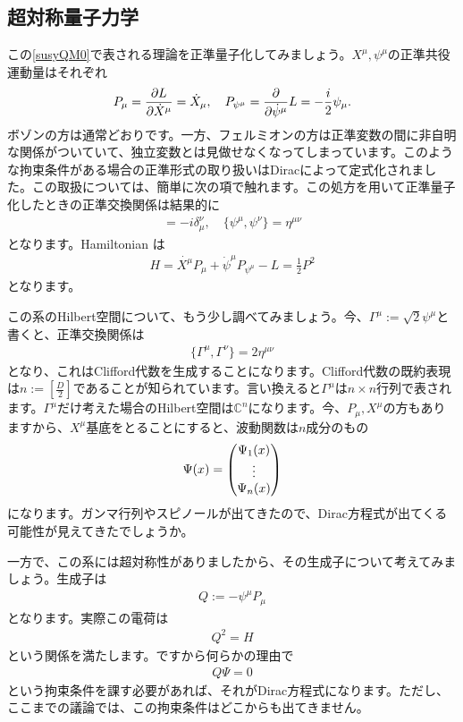 \documentclass[report,paper=a4, fontsize=12pt, line_length=16cm, number_of_lines=33,dvipdfmx]{jlreq}
\numberwithin{equation}{chapter}
\numberwithin{equation}{section}
\newcommand{\Cb}{\mathbb{C}}
\begin{document}
\subsection{超対称量子力学}\label{subsec:susyQM}
この\eqref{susyQM0}で表される理論を正準量子化してみましょう。$X^{\mu},\psi^{\mu}$の正準共役運動量はそれぞれ
\begin{align}
  P_{\mu}=\pdv{L}{\dot{X}^{\mu}}=\dot{X}_{\mu},\quad
  P_{\psi^{\mu}}=\pdv{\dot{\psi}^{\mu}}L=-\frac{i}{2}\psi_{\mu}.
\end{align}
ボゾンの方は通常どおりです。一方、フェルミオンの方は正準変数の間に非自明な関係がついていて、独立変数とは見做せなくなってしまっています。このような拘束条件がある場合の正準形式の取り扱いはDiracによって定式化されました。この取扱については、簡単に次の項で触れます。この処方を用いて正準量子化したときの正準交換関係は結果的に
\begin{align}
  [P_{\mu},X^{\nu}]=-i\delta_{\mu}^{\nu},\quad
  \{\psi^{\mu},\psi^{\nu}\}=\eta^{\mu\nu}
\end{align}
となります。Hamiltonian は
\begin{align}
  H=\dot{X^{\mu}}P_{\mu}+\dot{\psi}^{\mu}P_{\psi^{\mu}}-L=\frac12 P^2
\end{align}
となります。

この系のHilbert空間について、もう少し調べてみましょう。今、$\Gamma^{\mu}:=\sqrt{2}\psi^{\mu}$と書くと、正準交換関係は
\begin{align}
  \{\Gamma^{\mu},\Gamma^{\nu}\}=2\eta^{\mu\nu}
\end{align}
となり、これはClifford代数を生成することになります。Clifford代数の既約表現は$n:=\left[\frac{D}{2}\right]$であることが知られています。言い換えると$\Gamma^{\mu}$は$n\times n$行列で表されます。$\Gamma^{\mu}$だけ考えた場合のHilbert空間は$\Cb^n$になります。今、$P_{\mu},X^{\mu}$の方もありますから、$X^{\mu}$基底をとることにすると、波動関数は$n$成分のもの
\begin{align}
  \Psi(x)=\mqty(
    \Psi_1(x)\\
    \vdots\\
    \Psi_n(x)
  )
\end{align}
になります。ガンマ行列やスピノールが出てきたので、Dirac方程式が出てくる可能性が見えてきたでしょうか。

一方で、この系には超対称性がありましたから、その生成子について考えてみましょう。生成子は
\begin{align}
  Q:=-\psi^{\mu}P_{\mu}
\end{align}
となります。実際この電荷は
\begin{align}
  Q^2=H
\end{align}
という関係を満たします。ですから何らかの理由で
\begin{align}
  Q\Psi=0
\end{align}
という拘束条件を課す必要があれば、それがDirac方程式になります。ただし、ここまでの議論では、この拘束条件はどこからも出てきません。
\end{document}
